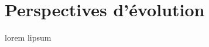 \section{Perspectives d'évolution}

\begin{frame}
\tableofcontents[currentsection]
\end{frame}
\begin{frame}
lorem lipsum
\end{frame}